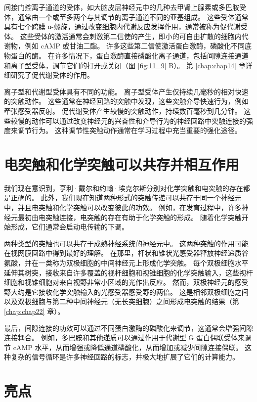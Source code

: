 间接门控离子通道的受体，如大脑皮层神经元中的几种去甲肾上腺素或多巴胺受体，通常由一个或至多两个与其调节的离子通道不同的亚基组成。 
这些受体通常具有七个跨膜 α-螺旋，通过改变细胞内代谢反应发挥作用，通常被称为促代谢受体。 
这些受体的激活通常会刺激第二信使的产生，即小的可自由扩散的细胞内代谢物，例如 cAMP 或甘油二酯。 
许多这些第二信使激活蛋白激酶，磷酸化不同底物蛋白的酶。 
在许多情况下，蛋白激酶直接磷酸化离子通道，包括间隙连接通道和离子型受体，调节它们的打开或关闭（图 \ref{fig:11_9} B）。 
第 \ref{chap:chap14} 章详细研究了促代谢受体的作用。


离子型和代谢型受体具有不同的功能。 
离子型受体产生仅持续几毫秒的相对快速的突触动作。 
这些通常在神经回路的突触中发现，这些突触介导快速行为，例如牵张感受器反射。 
促代谢受体产生较慢的突触动作，持续数百毫秒到几分钟。 
这些较慢的动作可以通过改变神经元的兴奋性和介导行为的神经回路中突触连接的强度来调节行为。 
这种调节性突触动作通常在学习过程中充当重要的强化途径。




\section{电突触和化学突触可以共存并相互作用}

我们现在意识到，亨利·戴尔和约翰·埃克尔斯分别对化学突触和电突触的存在都是正确的。 
此外，我们现在知道两种形式的突触传递可以共存于同一个神经元中，并且电突触和化学突触可以改变彼此的功效。 
例如，在发育过程中，许多神经元最初由电突触连接，电突触的存在有助于化学突触的形成。 
随着化学突触开始形成，它们通常会启动电传输的下调。


两种类型的突触也可以共存于成熟神经系统的神经元中。 
这两种突触的作用可能在视网膜回路中得到最好的理解。 在那里，杆状和锥状光感受器释放神经递质谷氨酸，并在一类称为双极细胞的中间神经元上形成化学突触。 
每个双极细胞水平延伸其树突，接收来自许多覆盖的视杆细胞和视锥细胞的化学突触输入，这些视杆细胞和视锥细胞对来自视野非常小区域的光作出反应。 
然而，双极神经元的感受野大约是它接收化学突触输入的光感受器感受野的两倍。 
这是相邻双极细胞之间以及双极细胞与第二种中间神经元（无长突细胞）之间形成电突触的结果（第 \ref{chap:chap22} 章）。


最后，间隙连接的功效可以通过不同蛋白激酶的磷酸化来调节，这通常会增强间隙连接耦合。 
例如，多巴胺和其他递质可以通过作用于代谢型 G 蛋白偶联受体来调节 cAMP 水平，从而增强或降低通道磷酸化，从而增加或减少间隙连接偶联。 
这种复杂的信号循环是许多神经回路的标志，并极大地扩展了它们的计算能力。


\section{亮点}

